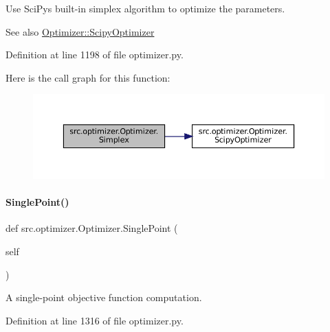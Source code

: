 Use Sci\+Py\textquotesingle{}s built-\/in simplex algorithm to optimize the parameters. 

\begin{DoxySeeAlso}{See also}
\hyperlink{classsrc_1_1optimizer_1_1Optimizer_a1e616a4c920b3e8935ca19e208b1c3be}{Optimizer\+::\+Scipy\+Optimizer} 
\end{DoxySeeAlso}


Definition at line 1198 of file optimizer.\+py.

Here is the call graph for this function\+:
\nopagebreak
\begin{figure}[H]
\begin{center}
\leavevmode
\includegraphics[width=350pt]{classsrc_1_1optimizer_1_1Optimizer_a1265cbe1250d67e385e9ed5ca9c946ea_cgraph}
\end{center}
\end{figure}
\mbox{\label{classsrc_1_1optimizer_1_1Optimizer_afe5c560532731458954ae6e9093b8376}} 
\paragraph{\texorpdfstring{Single\+Point()}{SinglePoint()}}
{\footnotesize\ttfamily def src.\+optimizer.\+Optimizer.\+Single\+Point (\begin{DoxyParamCaption}\item[{}]{self }\end{DoxyParamCaption})}



A single-\/point objective function computation. 



Definition at line 1316 of file optimizer.\+py.

